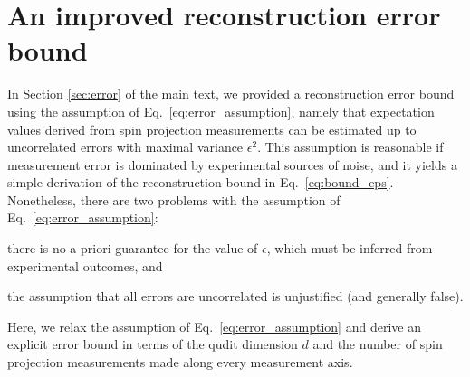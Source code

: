 \documentclass[notitlepage,twocolumn]{revtex4-2}
\begin{document}
\section{An improved reconstruction error bound}
\label{sec:bound}

In Section \ref{sec:error} of the main text, we provided a reconstruction error bound using the assumption of Eq.~\eqref{eq:error_assumption}, namely that expectation values derived from spin projection measurements can be estimated up to uncorrelated errors with maximal variance $\epsilon^2$.
This assumption is reasonable if measurement error is dominated by experimental sources of noise, and it yields a simple derivation of the reconstruction bound in Eq.~\eqref{eq:bound_eps}.
Nonetheless, there are two problems with the assumption of Eq.~\eqref{eq:error_assumption}:
\begin{enumerate*}
\item there is no a priori guarantee for the value of $\epsilon$, which must be inferred from experimental outcomes, and
\item the assumption that all errors are uncorrelated is unjustified (and generally false).
\end{enumerate*}
Here, we relax the assumption of Eq.~\eqref{eq:error_assumption} and derive an explicit error bound in terms of the qudit dimension $d$ and the number of spin projection measurements made along every measurement axis.
\end{document}
